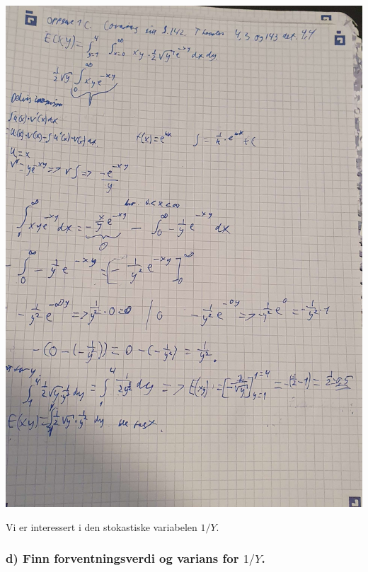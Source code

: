 \documentclass[
  12pt,
  a4paper,
  DIV=11,
  numbers=noendperiod]{scrartcl}
\begin{document}
\includegraphics{oblig2_utregning/oppgave1_c_feil.jpg}

Vi er interessert i den stokastiske variabelen \(1/Y\).

\subsubsection{\texorpdfstring{d) Finn forventningsverdi og varians for
\(1/Y\).}{d) Finn forventningsverdi og varians for 1/Y.}}\label{d-finn-forventningsverdi-og-varians-for-1y.}
\end{document}
